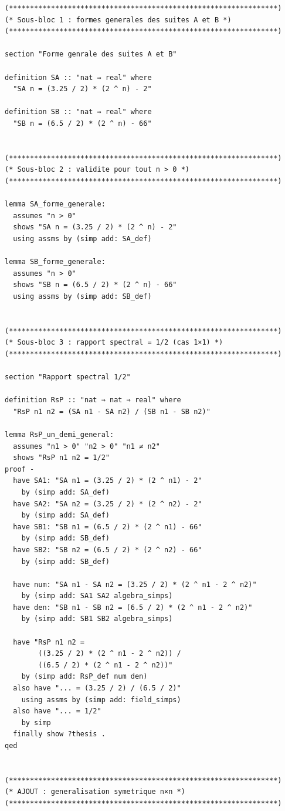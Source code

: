 \documentclass[a4paper,11pt]{article}
\begin{document}
\begin{holcode}[title={\textcolor{white}{Fichier : methode\_spectral.thy -- Partie 1/4}}]
\begin{lstlisting}
(****************************************************************)
(* Sous-bloc 1 : formes generales des suites A et B *)
(****************************************************************)

section "Forme genrale des suites A et B"

definition SA :: "nat ⇒ real" where
  "SA n = (3.25 / 2) * (2 ^ n) - 2"

definition SB :: "nat ⇒ real" where
  "SB n = (6.5 / 2) * (2 ^ n) - 66"


(****************************************************************)
(* Sous-bloc 2 : validite pour tout n > 0 *)
(****************************************************************)

lemma SA_forme_generale:
  assumes "n > 0"
  shows "SA n = (3.25 / 2) * (2 ^ n) - 2"
  using assms by (simp add: SA_def)

lemma SB_forme_generale:
  assumes "n > 0"
  shows "SB n = (6.5 / 2) * (2 ^ n) - 66"
  using assms by (simp add: SB_def)


(****************************************************************)
(* Sous-bloc 3 : rapport spectral = 1/2 (cas 1×1) *)
(****************************************************************)

section "Rapport spectral 1/2"

definition RsP :: "nat ⇒ nat ⇒ real" where
  "RsP n1 n2 = (SA n1 - SA n2) / (SB n1 - SB n2)"

lemma RsP_un_demi_general:
  assumes "n1 > 0" "n2 > 0" "n1 ≠ n2"
  shows "RsP n1 n2 = 1/2"
proof -
  have SA1: "SA n1 = (3.25 / 2) * (2 ^ n1) - 2"
    by (simp add: SA_def)
  have SA2: "SA n2 = (3.25 / 2) * (2 ^ n2) - 2"
    by (simp add: SA_def)
  have SB1: "SB n1 = (6.5 / 2) * (2 ^ n1) - 66"
    by (simp add: SB_def)
  have SB2: "SB n2 = (6.5 / 2) * (2 ^ n2) - 66"
    by (simp add: SB_def)

  have num: "SA n1 - SA n2 = (3.25 / 2) * (2 ^ n1 - 2 ^ n2)"
    by (simp add: SA1 SA2 algebra_simps)
  have den: "SB n1 - SB n2 = (6.5 / 2) * (2 ^ n1 - 2 ^ n2)"
    by (simp add: SB1 SB2 algebra_simps)

  have "RsP n1 n2 =
        ((3.25 / 2) * (2 ^ n1 - 2 ^ n2)) /
        ((6.5 / 2) * (2 ^ n1 - 2 ^ n2))"
    by (simp add: RsP_def num den)
  also have "... = (3.25 / 2) / (6.5 / 2)"
    using assms by (simp add: field_simps)
  also have "... = 1/2"
    by simp
  finally show ?thesis .
qed


(****************************************************************)
(* AJOUT : generalisation symetrique n×n *)
(****************************************************************)


\end{lstlisting}
\end{holcode}
\end{document}
